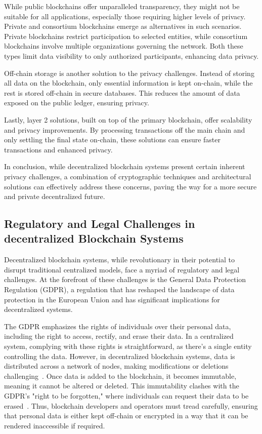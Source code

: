 While public blockchains offer unparalleled transparency, they might not be suitable for all applications, especially those requiring higher levels of privacy. Private and consortium blockchains emerge as alternatives in such scenarios. Private blockchains restrict participation to selected entities, while consortium blockchains involve multiple organizations governing the network. Both these types limit data visibility to only authorized participants, enhancing data privacy.

Off-chain storage is another solution to the privacy challenges. Instead of storing all data on the blockchain, only essential information is kept on-chain, while the rest is stored off-chain in secure databases. This reduces the amount of data exposed on the public ledger, ensuring privacy.

Lastly, layer 2 solutions, built on top of the primary blockchain, offer scalability and privacy improvements. By processing transactions off the main chain and only settling the final state on-chain, these solutions can ensure faster transactions and enhanced privacy.

In conclusion, while decentralized blockchain systems present certain inherent privacy challenges, a combination of cryptographic techniques and architectural solutions can effectively address these concerns, paving the way for a more secure and private decentralized future.

\subsection{Regulatory and Legal Challenges in decentralized Blockchain Systems}
Decentralized blockchain systems, while revolutionary in their potential to disrupt traditional centralized models, face a myriad of regulatory and legal challenges. At the forefront of these challenges is the General Data Protection Regulation (GDPR), a regulation that has reshaped the landscape of data protection in the European Union and has significant implications for decentralized systems.

The GDPR emphasizes the rights of individuals over their personal data, including the right to access, rectify, and erase their data. In a centralized system, complying with these rights is straightforward, as there's a single entity controlling the data. However, in decentralized blockchain systems, data is distributed across a network of nodes, making modifications or deletions challenging~\cite{Schwerin.2018}. Once data is added to the blockchain, it becomes immutable, meaning it cannot be altered or deleted. This immutability clashes with the GDPR's "right to be forgotten," where individuals can request their data to be erased~\cite{BelenSaglam}. Thus, blockchain developers and operators must tread carefully, ensuring that personal data is either kept off-chain or encrypted in a way that it can be rendered inaccessible if required.

